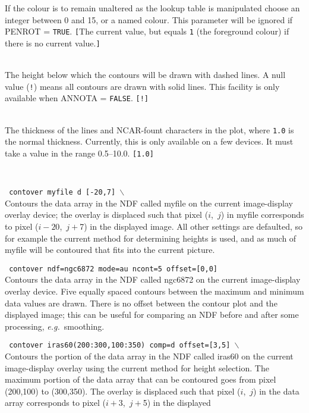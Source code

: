 \documentclass[twoside,11pt]{article}
\newcommand{\htmlref}[2]{#1}
\newcommand{\sstexamples}[1]{
   \goodbreak
   \item[Examples:] \mbox{} \\
   \vspace{-3.5ex}
   \begin{description}
      #1
   \end{description}
}
\newcommand{\sstsubsection}[1]{ \item[{#1}] \mbox{} \\}
\newcommand{\sstexamplesubsection}[2]{\sloppy \item{\ssttt #1} \mbox{} \\ #2 }
\newcommand{\ssttt}{\tt}
\newcommand{\sstexamples}[1]{%
      \item[\htmlref{Examples:}{ap:example}]%
      \begin{description}
         #1
      \end{description}
   }
\newcommand{\sstsubsection}[1]{\item[{#1}]}
\newcommand{\sstexamplesubsection}[2]{%
      \item[{\ssttt #1}]
      #2\smallskip%
   }
\begin{document}
{{{         If the colour is to remain unaltered as the lookup table is
         manipulated choose an integer between 0 and 15, or a named
         colour.  This parameter will be ignored if PENROT = {\tt TRUE}.
         {\tt [}The current value, but equals {\tt 1} (the foreground
         colour) if there is no current value.{\tt ]}
      }
      \sstsubsection{
         DASHED = \_REAL (Read)
      }{
         The height below which the contours will be drawn with dashed
         lines.  A null value ({\tt !}) means all contours are drawn with
         solid lines.  This facility is only available when ANNOTA =
         {\tt FALSE}. {\tt [!]}
      }
      \sstsubsection{
         THICK = \_REAL (Read)
      }{
         The thickness of the lines and NCAR-fount characters in the plot, where
         {\tt 1.0} is the normal thickness.  Currently, this is only available
         on a few devices.  It must take a value in the range 0.5--10.0.
         {\tt [1.0]}
      }
   }
   \sstexamples{
      \sstexamplesubsection{
         contover myfile d [-20,7] $\backslash$
      }{
         Contours the data array in the NDF called myfile on the
         current image-display overlay device; the overlay is displaced
         such that pixel ($i$,~$j$) in myfile corresponds to pixel
         ($i-20$,~$j+$7) in
         the displayed image.  All other settings are defaulted, so for
         example the current method for determining heights is used,
         and as much of myfile will be contoured that fits into the
         current picture.
      }
      \sstexamplesubsection{
         contover ndf=ngc6872 mode=au ncont=5 offset=[0,0]
      }{
         Contours the data array in the NDF called ngc6872 on the
         current image-display overlay device.  Five equally spaced
         contours between the maximum and minimum data values are
         drawn.  There is no offset between the contour plot and the
         displayed image; this can be useful for comparing an NDF
         before and after some processing, {\it e.g.}\ smoothing.
      }
      \sstexamplesubsection{
         contover iras60(200:300,100:350) comp=d offset=[3,5] $\backslash$
      }{
         Contours the portion of the data array in the NDF called iras60
         on the current image-display overlay using the current method
         for height selection.  The maximum portion of the data array
         that can be contoured goes from pixel (200,100) to (300,350).
         The overlay is displaced such that pixel ($i$,~$j$) in the
         data array corresponds to pixel ($i+$3,~$j+$5) in the displayed
}}}
\end{document}

